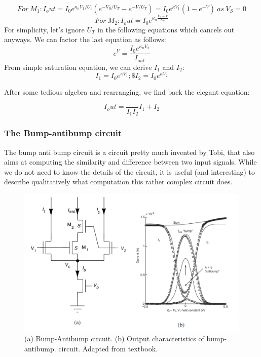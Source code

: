 \begin{equation}
    For \ M_1: I_out = I_0e^{\kappa_n V_1/U_t}(e^{-V_S/U_T} - e^{-V/U_T}) = I_0e^{\kappa V_1}(1 - e^{-V}) \ as \ V_S = 0 
\end{equation}
\begin{equation}
    For \ M_2: I_out = I_0e^{\kappa_n \frac{V_2 - V}{U_T}} 
\end{equation}
For simplicity, let's ignore $U_T$ in the following equations which cancels out anyways. 
We can factor the last equation as follows: 
\begin{equation}
    e^V = \frac{I_0e^{\kappa_n V_2}}{I_{out}} 
\end{equation}
From simple saturation equation, we can derive $I_1$ and $I_2$:
\begin{equation}
    I_1 = I_0 e^{\kappa V_1}; \$I_2 = I_0 e^{\kappa V_2}
\end{equation}

After some tedious algebra and rearranging, we find back the elegant equation: 

\begin{equation}
    I_out = \frac{}{I_1 I_2}{I_1 + I_2}
\end{equation}

\subsubsection{The Bump-antibump circuit}

The bump anti bump circuit is a circuit pretty much invented by Tobi, that also aims at computing the similarity and difference between two input signals. While we do not need to know the details of the circuit, it is useful (and interesting) to describe qualitatively what computation this rather complex circuit does. 

\begin{figure}[H]
    \centering
    \includegraphics[width=0.85\linewidth]{../../Figures/Bump_Antibump.PNG}
    \caption{(a) Bump-Antibump circuit. (b)  Output characteristics of bump-antibump.  circuit. Adapted from textbook.}
    \label{fig:basalandcerebellum}
\end{figure}

